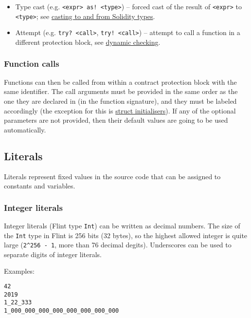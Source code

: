 \begin{itemize}
	\item Type cast (e.g. \texttt{<expr> as! <type>}) – forced cast of the result of \texttt{<expr>} to \texttt{<type>}; see \hyperref[sec:appendix-b-casting-to-and-from-solidity-types]{casting to and from Solidity types}.\\
	\item Attempt (e.g. \texttt{try? <call>}, \texttt{try! <call>}) – attempt to call a function in a different protection block, see \hyperref[sec:appendix-b-dynamic-checking]{dynamic checking}.
\end{itemize}

\subsubsection{Function calls}
\label{sec:appendix-b-function-calls}

Functions can then be called from within a contract protection block with the same identifier. The call arguments must be provided in the same order as the one they are declared in (in the function signature), and they must be labeled accordingly (the exception for this is \hyperref[sec:appendix-b-instances]{struct initialisers}). If any of the optional parameters are not provided, then their default values are going to be used automatically.

\subsection{Literals}
\label{sec:appendix-b-literals}

Literals represent fixed values in the source code that can be assigned to constants and variables.

\subsubsection{Integer literals}
\label{sec:appendix-b-integer-literals}

Integer literals (Flint type \texttt{Int}) can be written as decimal numbers. The size of the \texttt{Int} type in Flint is 256 bits (32 bytes), so the highest allowed integer is quite large (\texttt{2^256 - 1}, more than 76 decimal degits). Underscores can be used to separate digits of integer literals.

Examples:

\begin{verbatim}
42
2019
1_22_333
1_000_000_000_000_000_000_000_000
\end{verbatim}


